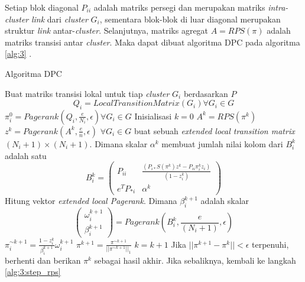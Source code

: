 \documentclass[
	a4paper, %
	12pt, %
	unnumberedsections, %
	twoside, %
]{LTJournalArticle}
\begin{document}
Setiap blok diagonal $P_{ii}$ adalah matriks persegi dan merupakan matriks \textit{intra-cluster} \textit{link} dari \textit{cluster} $G_i$, sementara blok-blok di luar diagonal merupakan struktur \textit{link} antar-\textit{cluster}. Selanjutnya, matriks agregat $A = RPS(\pi)$ adalah matriks transisi antar \textit{cluster}. Maka dapat dibuat algoritma DPC pada algoritma \ref{alg:3} \citep{zhuetal2005distributedPagerank}.

\begin{algorithm}
	\caption{Algoritma DPC \citep{zhuetal2005distributedPagerank}}
	\label{alg:3}
	\begin{algorithmic}[1]
		\State Buat matriks transisi lokal untuk tiap \textit{cluster} $G_i$ berdasarkan $P$ 
			\begin{equation*} Q_i = LocalTransitionMatrix(G_i) \forall G_i \in G \end{equation*}
		\State $\pi_i^0 = Pagerank(Q_i, \frac{e}{N_i}, \epsilon) \forall G_i \in G$
		\State Inisialisasi $k = 0$
		\State \label{alg:3:step_rps}
			$A^k = RPS(\pi^k)$
		\State
			$z^k = Pagerank(A^k, \frac{e}{n}, \epsilon)$
		\State $\forall G_i \in G$ buat sebuah \textit{extended local transition matrix} $(N_i + 1) \times (N_i + 1)$. Dimana skalar $\alpha^k$ membuat jumlah nilai kolom dari $B^k_i$ adalah satu
			\begin{equation*}
				B_i^k =
				\begin{pmatrix}
					P_{ii} 		& \frac{(P_{i*}S(\pi^k)z^k - P_{ii}\pi_i^kz_i)}{(1 - z^k_i)} \\
					e^TP_{*i} & \alpha^k
				\end{pmatrix}
			\end{equation*}
		\State Hitung vektor \textit{extended local Pagerank}. Dimana $\beta^{k+1}_i$ adalah skalar
			\begin{equation*}
				\begin{pmatrix}
					\omega^{k+1}_i \\
					\beta^{k+1}_i
				\end{pmatrix}
				= Pagerank(B^k_i, \frac{e}{(N_i + 1)}, \epsilon)
			\end{equation*}
		\State $\pi^{\sim k+1}_i = \frac{1 - z^k_i}{\beta^{k+1}_i} \omega^{k+1}_i$
		\State $\pi^{k+1} = \frac{\pi^{\sim k+1}}{||\pi^{\sim k+1}||_1}$
		\State $k = k+1$
		\State Jika $||\pi^{k+1} - \pi^k|| < \epsilon$ terpenuhi, berhenti dan berikan $\pi^{k}$ sebagai hasil akhir. Jika sebaliknya, kembali ke langkah \ref{alg:3:step_rps}
	\end{algorithmic}
\end{algorithm}
\end{document}
